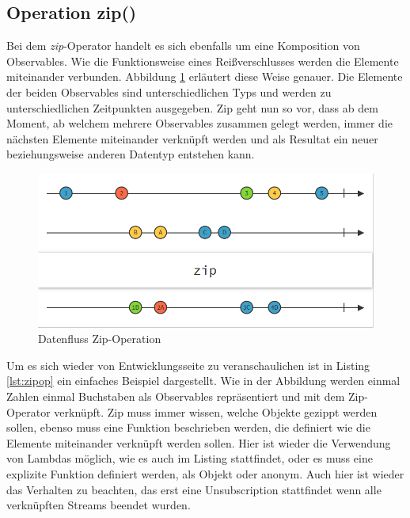 \subsection{Operation zip()}
Bei dem \textit{zip}-Operator handelt es sich ebenfalls um eine Komposition von Observables. Wie die Funktionsweise eines Reißverschlusses werden die Elemente miteinander verbunden. Abbildung \ref{pic:zipop} erläutert diese Weise genauer. Die Elemente der beiden Observables sind unterschiedlichen Typs und werden zu unterschiedlichen Zeitpunkten ausgegeben. Zip geht nun so vor, dass ab dem Moment, ab welchem mehrere Observables zusammen gelegt werden, immer die nächsten Elemente miteinander verknüpft werden und als Resultat ein neuer beziehungsweise anderen Datentyp entstehen kann.
\begin{figure}
	\centering
	\includegraphics[width=1\textwidth]{Abb/zip}
	\caption{Datenfluss Zip-Operation}
	\label{pic:zipop}
\end{figure}
 
Um es sich wieder von Entwicklungsseite zu veranschaulichen ist in Listing \ref{lst:zipop} ein einfaches Beispiel dargestellt. Wie in der Abbildung werden einmal Zahlen einmal Buchstaben als Observables repräsentiert und mit dem Zip-Operator verknüpft. Zip muss immer wissen, welche Objekte gezippt werden sollen, ebenso muss eine Funktion beschrieben werden, die definiert wie die Elemente miteinander verknüpft werden sollen. Hier ist wieder die Verwendung von Lambdas möglich, wie es auch im Listing stattfindet, oder es muss eine explizite Funktion definiert werden, als Objekt oder anonym. Auch hier ist wieder das Verhalten zu beachten, das erst eine Unsubscription stattfindet wenn alle verknüpften Streams beendet wurden. 